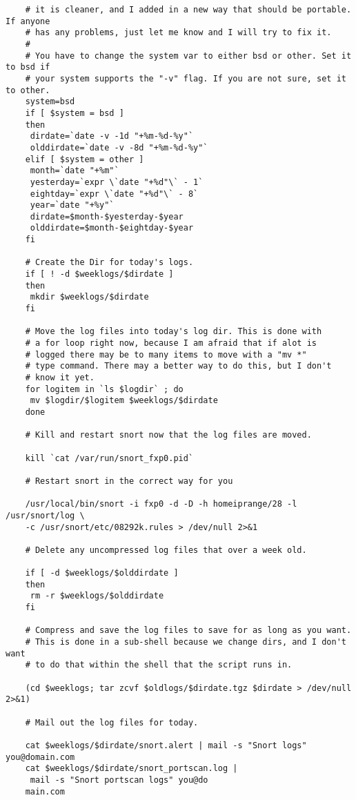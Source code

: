 \documentclass{article}
\begin{document}
\begin{verbatim}
    # it is cleaner, and I added in a new way that should be portable. If anyone
    # has any problems, just let me know and I will try to fix it.
    #
    # You have to change the system var to either bsd or other. Set it to bsd if
    # your system supports the "-v" flag. If you are not sure, set it to other.
    system=bsd
    if [ $system = bsd ]
    then
     dirdate=`date -v -1d "+%m-%d-%y"`
     olddirdate=`date -v -8d "+%m-%d-%y"`
    elif [ $system = other ]
     month=`date "+%m"`
     yesterday=`expr \`date "+%d"\` - 1`
     eightday=`expr \`date "+%d"\` - 8`
     year=`date "+%y"`
     dirdate=$month-$yesterday-$year
     olddirdate=$month-$eightday-$year
    fi
    
    # Create the Dir for today's logs.
    if [ ! -d $weeklogs/$dirdate ]
    then
     mkdir $weeklogs/$dirdate
    fi
    
    # Move the log files into today's log dir. This is done with
    # a for loop right now, because I am afraid that if alot is
    # logged there may be to many items to move with a "mv *"
    # type command. There may a better way to do this, but I don't
    # know it yet.
    for logitem in `ls $logdir` ; do
     mv $logdir/$logitem $weeklogs/$dirdate
    done
    
    # Kill and restart snort now that the log files are moved.
 
    kill `cat /var/run/snort_fxp0.pid`
    
    # Restart snort in the correct way for you
 
    /usr/local/bin/snort -i fxp0 -d -D -h homeiprange/28 -l /usr/snort/log \
    -c /usr/snort/etc/08292k.rules > /dev/null 2>&1

    # Delete any uncompressed log files that over a week old.
 
    if [ -d $weeklogs/$olddirdate ]
    then
     rm -r $weeklogs/$olddirdate
    fi

    # Compress and save the log files to save for as long as you want.
    # This is done in a sub-shell because we change dirs, and I don't want 
    # to do that within the shell that the script runs in.

    (cd $weeklogs; tar zcvf $oldlogs/$dirdate.tgz $dirdate > /dev/null 2>&1)

    # Mail out the log files for today.

    cat $weeklogs/$dirdate/snort.alert | mail -s "Snort logs" you@domain.com
    cat $weeklogs/$dirdate/snort_portscan.log |
     mail -s "Snort portscan logs" you@do
    main.com
    \end{verbatim}
\end{document}
